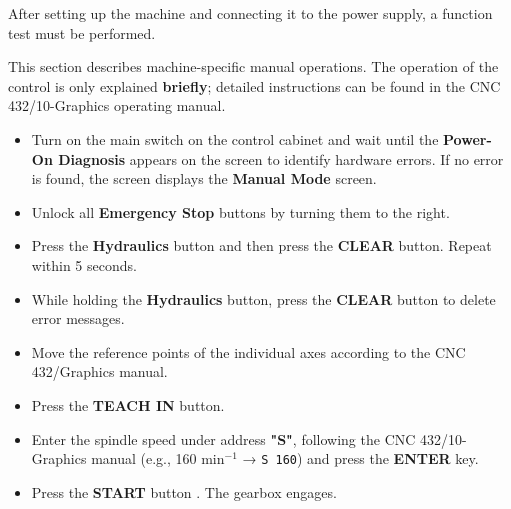 

After setting up the machine and connecting it to the power supply, a function test must be performed.

This section describes machine-specific manual operations. The operation of the control is only explained \textbf{briefly}; detailed instructions can be found in the CNC 432/10-Graphics operating manual.

\begin{itemize}
    \item Turn on the main switch on the control cabinet and wait until the \textbf{Power-On Diagnosis} appears on the screen to identify hardware errors. If no error is found, the screen displays the \textbf{Manual Mode} screen.
    
    \item Unlock all \textbf{Emergency Stop} buttons by turning them to the right.
    
    \item Press the \textbf{Hydraulics} button  and then press the \textbf{CLEAR} button. Repeat within 5 seconds.
    
    \item While holding the \textbf{Hydraulics} button, press the \textbf{CLEAR} button to delete error messages.
    
    \item Move the reference points of the individual axes according to the CNC 432/Graphics manual.
    
    \item Press the \textbf{TEACH IN} button.
    
    \item Enter the spindle speed under address \textbf{"S"}, following the CNC 432/10-Graphics manual (e.g., 160 min\(^{-1}\) → \texttt{S 160}) and press the \textbf{ENTER} key.
    
    \item Press the \textbf{START} button . The gearbox engages.
\end{itemize}


